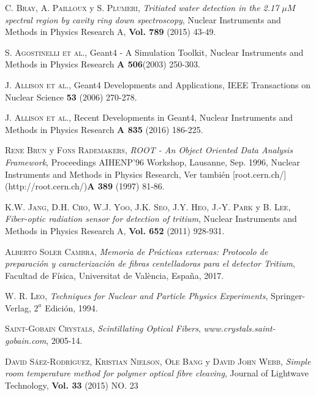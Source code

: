 \begin{thebibliography}{100}
 \textsc{C. Bray}, \textsc{A. Pailloux} y \textsc{S. Plumeri},
\textit{Tritiated water detection in the 2.17 $\mu M$ spectral region by cavity ring down spectroscopy}, Nuclear Instruments and Methods in Physics Research A, \textbf{Vol. 789} (2015) 43-49.

 \textsc { S. Agostinelli et al.}, Geant4 - A Simulation Toolkit, Nuclear Instruments and Methods  in Physics Research {\bf A 506}(2003) 250-303.

\textsc {J. Allison et al.}, Geant4 Developments and Applications, IEEE Transactions on Nuclear Science {\bf 53}  (2006) 270-278.

\textsc {J. Allison et al.}, Recent Developments in Geant4,  Nuclear Instruments and Methods   in Physics Research {\bf A 835} (2016) 186-225.

\textsc {Rene Brun} y \textsc{Fons Rademakers}, \textit{ROOT - An Object Oriented Data Analysis Framework}, Proceedings AIHENP'96 Workshop, Lausanne, Sep. 1996, Nuclear Instruments and Methods in Physics Research, Ver también  [root.cern.ch/](http://root.cern.ch/){\bf A 389} (1997) 81-86.


 \textsc{K.W. Jang}, \textsc{D.H. Cho}, \textsc{W.J. Yoo}, \textsc{J.K. Seo}, \textsc{J.Y. Heo}, \textsc{J.-Y. Park} y \textsc{B. Lee},
\textit{Fiber-optic radiation sensor for detection of tritium}, Nuclear Instruments and Methods in Physics Research A, \textbf{Vol. 652} (2011) 928-931.

 \textsc{Alberto Soler Cambra},
\textit{ Memoria de Prácticas externas: Protocolo de preparación y caracterización de fibras centelladoras para el detector Tritium}, Facultad de Física, Universitat de València, España, 2017.

 \textsc{W. R. Leo},
\textit{Techniques for Nuclear and Particle Physics Experiments}, Springer-Verlag, $2^a$ Edición, 1994. 

 \textsc{Saint-Gobain Crystals},
\textit{Scintillating Optical Fibers}, \textit{www.crystals.saint-gobain.com}, 2005-14.

 \textsc{David Sáez-Rodríguez}, \textsc{Kristian Nielson}, \textsc{Ole Bang} y \textsc{David John Webb},
\textit{Simple room temperature method for polymer optical fibre cleaving}, Journal of Lightwave Technology, \textbf{Vol. 33} (2015) \textsc{NO. 23} 


\end{thebibliography}
